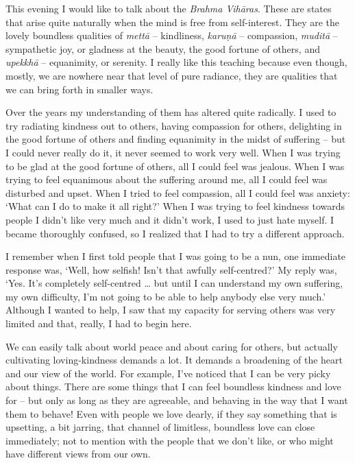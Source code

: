 

This evening I would like to talk about the \textit{Brahma Vih\=aras}. These are states that arise quite naturally when the mind is free from self-interest. They are the lovely boundless qualities of \textit{\textit{mett\=a}} -- kindliness, \textit{\textit{karu\d{n}\=a}} -- compassion, \textit{mudit\=a} -- sympathetic joy, or gladness at the beauty, the good fortune of others, and \textit{upekkh\=a} -- equanimity, or serenity. I really like this teaching because even though, mostly, we are nowhere near that level of pure radiance, they are qualities that we can bring forth in smaller ways.

Over the years my understanding of them has altered quite radically. I used to try radiating kindness out to others, having compassion for others, delighting in the good fortune of others and finding equanimity in the midst of suffering -- but I could never really do it, it never seemed to work very well. When I was trying to be glad at the good fortune of others, all I could feel was jealous. When I was trying to feel equanimous about the suffering around me, all I could feel was disturbed and upset. When I tried to feel compassion, all I could feel was anxiety: `What can I do to make it all right?' When I was trying to feel kindness towards people I didn't like very much and it didn't work, I used to just hate myself. I became thoroughly confused, so I realized that I had to try a different approach.

I remember when I first told people that I was going to be a nun, one immediate response was, `Well, how selfish! Isn't that awfully self-centred?' My reply was, `Yes. It's completely self-centred  \ldots{}  but until I can understand my own suffering, my own difficulty, I'm not going to be able to help anybody else very much.' Although I wanted to help, I saw that my capacity for serving others was very limited and that, really, I had to begin here.

We can easily talk about world peace and about caring for others, but actually cultivating loving-kindness demands a lot. It demands a broadening of the heart and our view of the world. For example, I've noticed that I can be very picky about things. There are some things that I can feel boundless kindness and love for -- but only as long as they are agreeable, and behaving in the way that I want them to behave! Even with people we love dearly, if they say something that is upsetting, a bit jarring, that channel of limitless, boundless love can close immediately; not to mention with the people that we don't like, or who might have different views from our own.

